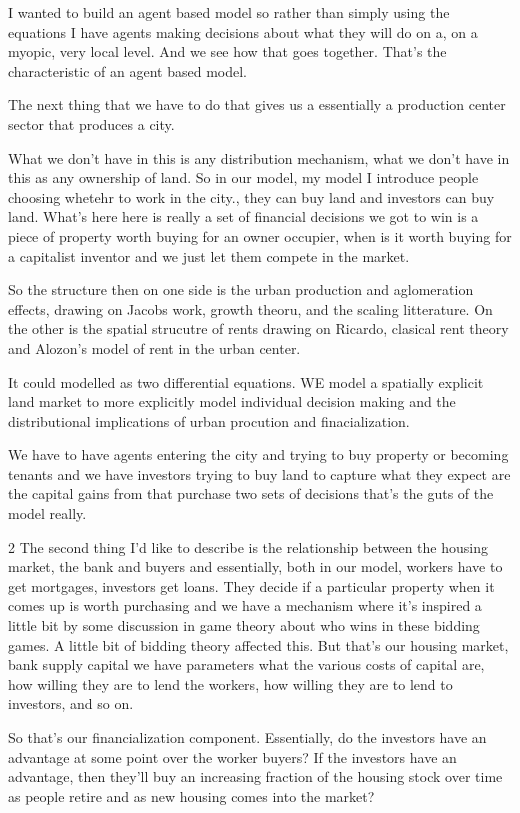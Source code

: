 \documentclass[]{article}
\begin{document}
I wanted to build an agent based model so rather than simply using the equations I have agents making decisions about what they will do on a, on a myopic, very local level. And we see how that goes together. That's the characteristic of an agent based model.

The next thing that we have to do that gives us a essentially a production center sector that produces a city.

What we don't have in this is any distribution mechanism, what we don't have in this as any ownership of land. So in our model, my model I introduce people choosing whetehr to work in the city., they can buy  land and investors can buy land. What's here here is really a set of financial decisions we got to win is a piece of property worth buying for an owner occupier, when is it worth buying for a capitalist inventor and we just let them compete in the market.

So the structure then on one side is the urban production and aglomeration effects, drawing on Jacobs work, growth theoru, and the scaling litterature. On the other is the spatial strucutre of rents drawing on Ricardo, clasical rent theory and Alozon's model of rent in the urban center. 

It could modelled as two differential equations. WE model a spatially explicit land market to more explicitly model individual decision making and the distributional implications of urban procution and finacialization. 

We have to have agents entering the city and trying to buy property or becoming tenants and we have investors trying to buy land to capture what they expect are the capital gains from that purchase two sets of decisions that's the guts of the model really.


2 The second thing I'd like to describe is the relationship between
the housing market, the bank and buyers and essentially, both in our model, workers have to get mortgages, investors get loans. They decide if a particular property when it comes up is worth purchasing and we have a mechanism where it's inspired a little bit by some discussion in game theory about who wins in these bidding games. A little bit of bidding theory affected this. But that's our housing market, bank supply capital we have parameters what the various costs of capital are, how willing they are to lend the workers, how willing they are to lend to investors, and so on.

So that's our financialization component. Essentially,  do the investors have an advantage at some point over the worker buyers? If the investors have an advantage, then they'll buy an increasing fraction of the housing stock over time as people retire and as new housing comes into the market?
\end{document}
